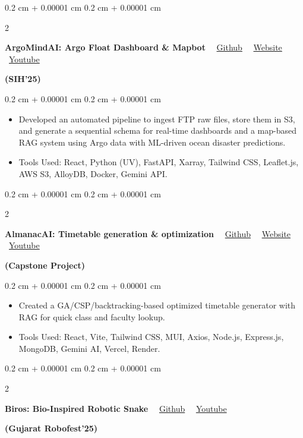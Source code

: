 \documentclass[10pt, letterpaper]{article}
\newenvironment{highlights}{
    \begin{itemize}[
        topsep=0.05 cm,
        parsep=0 cm,
        partopsep=0pt,
        itemsep=0pt,
        leftmargin=0.4 cm + 10pt
    ]
}{
    \end{itemize}
} %
\newenvironment{onecolentry}{
    \begin{adjustwidth}{
        0.2 cm + 0.00001 cm
    }{
        0.2 cm + 0.00001 cm
    }
}{
    \end{adjustwidth}
} %
\newenvironment{twocolentry}[2][]{
    \onecolentry
    \def\secondColumn{#2}
    \setcolumnwidth{\fill, 5.0 cm}
    \begin{paracol}{2}
}{
    \switchcolumn \raggedleft \secondColumn
    \end{paracol}
    \endonecolentry
} %
\begin{document}
\begin{twocolentry}{
    \textbf{(SIH'25)}
}
    \textbf{ArgoMindAI: Argo Float Dashboard \& Mapbot}~
    \faGithub~\href{https://github.com/Harjotraith04/Argo_Mind_SIH}{Github}~%
    \faGlobe~\href{https://argo-mind-sih.vercel.app}{Website}~%
    \faYoutube~\href{https://youtu.be/STzxNc0rvqY?si=Qd_6mYhq0xFp1jU4}{Youtube}
\end{twocolentry}

\vspace{0.10 cm}
\begin{onecolentry}
    \begin{highlights}
        \item Developed an automated pipeline to ingest FTP raw files, store them in S3, and generate a sequential schema for real-time dashboards and a map-based RAG system using Argo data with ML-driven ocean disaster predictions.
        \item Tools Used: React, Python (UV), FastAPI, Xarray, Tailwind CSS, Leaflet.js, AWS S3, AlloyDB, Docker, Gemini API.
    \end{highlights}
\end{onecolentry} 
\vspace{0.2 cm}

\begin{twocolentry}{
    \textbf{(Capstone Project)}
}
    \textbf{AlmanacAI: Timetable generation \& optimization}~
    \faGithub~\href{https://github.com/Harjotraith04/Time_Table_Generation_AI_Tool}{Github}~%
    \faGlobe~\href{https://timetable-frontend-psi.vercel.app/}{Website}~%
    \faYoutube~\href{https://youtu.be/HOQBrz_d8fI?si=mKR9ZkzMCdUY1DcX}{Youtube}
\end{twocolentry}

\vspace{0.10 cm}
\begin{onecolentry}
    \begin{highlights}
        \item Created a GA/CSP/backtracking-based optimized timetable generator with RAG for quick class and faculty lookup.
        \item Tools Used: React, Vite, Tailwind CSS, MUI, Axios, Node.js, Express.js, MongoDB, Gemini AI, Vercel, Render.
    \end{highlights}
\end{onecolentry}

\vspace{0.2 cm}

\begin{twocolentry}{
    \textbf{(Gujarat Robofest'25)}
}
    \textbf{Biros: Bio-Inspired Robotic Snake}~
    \faGithub~\href{https://github.com/Harjotraith04/Robotic-Snake}{Github}~%
    \faYoutube~\href{https://youtu.be/rBAIBMQLFJA?si=zjd_w4SYrGHXlru9}{Youtube}
\end{twocolentry}
\end{document}
